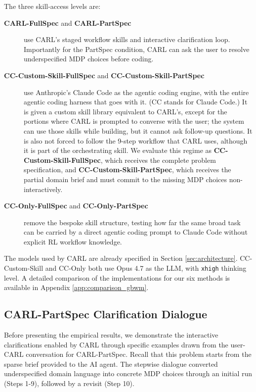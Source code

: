 \documentclass[mnsc,sglanonrev]{informs4}
\begin{document}
The three skill-access levels are:
%
\begin{description}
  \item[\textbf{CARL-FullSpec} and \textbf{CARL-PartSpec}] use CARL's staged workflow skills and interactive clarification loop. Importantly for the PartSpec condition, CARL can ask the user to resolve underspecified MDP choices before coding.
  \item[\textbf{CC-Custom-Skill-FullSpec} and \textbf{CC-Custom-Skill-PartSpec}] use Anthropic's Claude Code as the agentic coding engine, with the entire agentic coding harness that goes with it. (CC stands for Claude Code.) It is given a custom skill library equivalent to CARL's, except for the portions where CARL is prompted to converse with the user; the system can use those skills while building, but it cannot ask follow-up questions. It is also not forced to follow the 9-step workflow that CARL uses, although it is part of the orchestrating skill. We evaluate this regime as \textbf{CC-Custom-Skill-FullSpec}, which receives the complete problem specification, and \textbf{CC-Custom-Skill-PartSpec}, which receives the partial domain brief and must commit to the missing MDP choices non-interactively.
  \item[\textbf{CC-Only-FullSpec} and \textbf{CC-Only-PartSpec}] remove the bespoke skill structure, testing how far the same broad task can be carried by a direct agentic coding prompt to Claude Code without explicit RL workflow knowledge.
\end{description}
%
The models used by CARL are already specified in Section \ref{sec:architecture}. CC-Custom-Skill and CC-Only both use Opus 4.7 as the LLM, with \texttt{xhigh} thinking level. A detailed comparison of the implementations for our six methods is available in Appendix \ref{app:comparison_gbwm}. 

\subsection{CARL-PartSpec Clarification Dialogue}
\label{sec:gbwm-carlpartspec-clarifications}

Before presenting the empirical results, we demonstrate the interactive clarifications enabled by CARL through specific examples drawn from the user-CARL conversation for CARL-PartSpec. Recall that this problem starts from the sparse brief provided to the AI agent. The stepwise dialogue converted underspecified domain language into concrete MDP choices through an initial run (Steps 1-9), followed by a revisit (Step 10).
%
\end{document}
